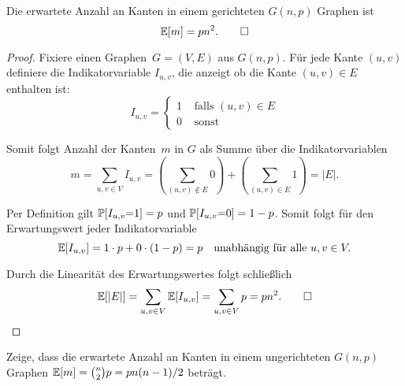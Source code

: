 \begin{lemma}\label{lemma:erwartete_kanten_in_gnp}
    Die  erwartete Anzahl an Kanten in einem gerichteten $G(n,p)$ Graphen ist \begin{equation*} \mathbb{E}\!\left[m\right] = p n^2. \qedhere \end{equation*}
\end{lemma}

\begin{proof}
    Fixiere einen Graphen~$G=(V,E)$ aus $G(n,p)$.
    Für jede Kante $(u,v)$ definiere die Indikatorvariable $I_{u,v}$, die anzeigt ob die Kante $(u,v) \in E$ enthalten ist:
    \begin{equation}
        I_{u,v} = \begin{cases}
            1 & \text{ falls } (u,v) \in E \\
            0 & \text{ sonst }
        \end{cases}
    \end{equation}

    \noindent Somit folgt Anzahl der Kanten~$m$ in $G$ als Summe über die Indikatorvariablen
    \begin{equation}
        m = \sum_{u,v \in V} I_{u,v} = \left(\sum_{(u,v) \not\in E} 0 \right) +  \left(\sum_{(u,v) \in E} 1\right) = |E|.
    \end{equation}

    \noindent Per Definition gilt $\mathbb{P}\!\left[I_{u,v} {=} 1\right] = p$ und $\mathbb{P}\!\left[I_{u,v} {=} 0\right] = 1-p$.
    Somit folgt für den Erwartungswert jeder Indikatorvariable
    \begin{equation}
        \mathbb{E}\!\left[I_{u,v}\right] = 1 \cdot p + 0 \cdot (1-p) = p \quad \text{unabhängig für alle } u, v \in V.
    \end{equation}

    \noindent Durch die Linearität des Erwartungswertes folgt schließlich
    \begin{equation}
        \mathbb{E}\!\left[|E|\right] = \sum_{u,v \in V} \mathbb{E}\!\left[I_{u,v}\right] = \sum_{u,v \in V} p = p n^2. \qedhere
    \end{equation}
\end{proof}

\begin{exercise}
    Zeige, dass die erwartete Anzahl an Kanten in einem ungerichteten $G(n,p)$ Graphen $\mathbb{E}\!\left[m\right] = \binom{n}{2} p = p n(n-1)/2$ beträgt.
\end{exercise}

\bigskip


